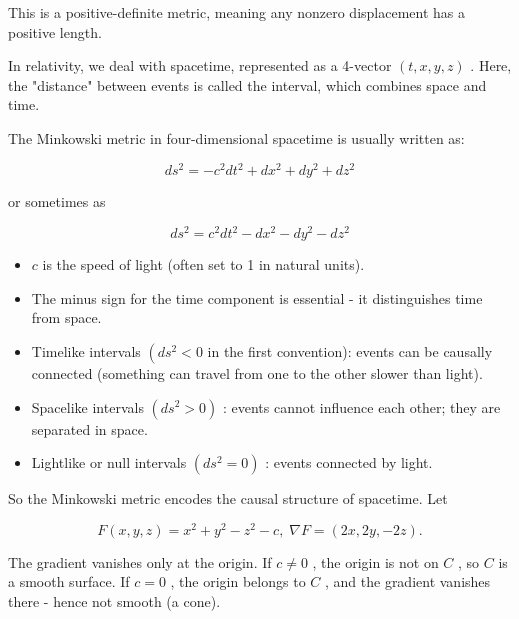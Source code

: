 \documentclass[10pt]{article}
\begin{document}
This is a positive-definite metric, meaning any nonzero displacement has a positive length.

In relativity, we deal with spacetime, represented as a 4-vector \(\left( {t,x,y,z}\right)\) . Here, the "distance" between events is called the interval, which combines space and time.

The Minkowski metric in four-dimensional spacetime is usually written as:

\[
d{s}^{2} =  - {c}^{2}d{t}^{2} + d{x}^{2} + d{y}^{2} + d{z}^{2}
\]

or sometimes as

\[
d{s}^{2} = {c}^{2}d{t}^{2} - d{x}^{2} - d{y}^{2} - d{z}^{2}
\]

\begin{itemize}\relax
\item\relax \(c\) is the speed of light (often set to 1 in natural units).
\end{itemize}

\begin{itemize}\relax
\item\relax The minus sign for the time component is essential - it distinguishes time from space.
\end{itemize}

\begin{itemize}\relax
\item\relax Timelike intervals \(\left( {d{s}^{2} < 0}\right.\) in the first convention): events can be causally connected (something can travel from one to the other slower than light).
\end{itemize}

\begin{itemize}\relax
\item\relax Spacelike intervals \(\left( {d{s}^{2} > 0}\right)\) : events cannot influence each other; they are separated in space.
\end{itemize}

\begin{itemize}\relax
\item\relax Lightlike or null intervals \(\left( {d{s}^{2} = 0}\right)\) : events connected by light.
\end{itemize}

So the Minkowski metric encodes the causal structure of spacetime. Let

\[
F\left( {x,y,z}\right)  = {x}^{2} + {y}^{2} - {z}^{2} - c,\;\nabla F = \left( {{2x},{2y}, - {2z}}\right) .
\]

The gradient vanishes only at the origin. If \(c \neq  0\) , the origin is not on \(C\) , so \(C\) is a smooth surface. If \(c = 0\) , the origin belongs to \(C\) , and the gradient vanishes there - hence not smooth (a cone).
\end{document}
